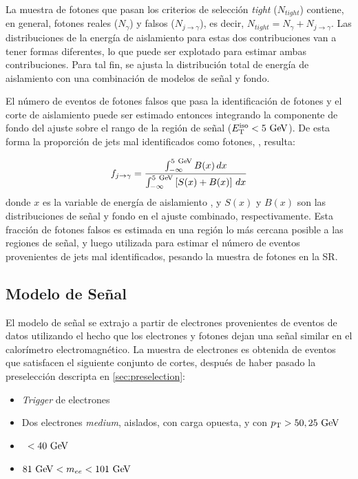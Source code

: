 La muestra de fotones que pasan los criterios de selección \emph{tight}
($N_{tight}$) contiene, en general, fotones reales ($N_{\gamma}$) y falsos
($N_{j\to\gamma}$), es decir, $N_{tight} = N_{\gamma} + N_{j\to\gamma}$.
Las distribuciones de la energía de aislamiento para estas
dos contribuciones van a tener formas diferentes, lo que puede ser explotado
para estimar ambas contribuciones. Para tal fin, se ajusta la distribución
total de energía de aislamiento con una combinación de modelos de señal y fondo.

El número de eventos de fotones falsos que pasa la identificación de fotones y
el corte de aislamiento puede ser estimado entonces integrando la componente de
fondo del ajuste sobre el rango de la región de señal ($\etiso<5\GeV$). De esta
forma la proporción de jets mal identificados como fotones, \fjg, resulta:

\begin{equation}\label{eq:jfake_formula}
  f_{j\to \gamma} = \frac{\int_{-\infty}^{5\gev} B(x)\, dx}{\int_{-\infty}^{5\gev} \left[S(x)+B(x)\right]\, dx}
\end{equation}
%
donde $x$ es la variable de energía de aislamiento \etiso, y $S(x)$ y $B(x)$ son
las distribuciones de señal y fondo en el ajuste combinado, respectivamente.
Esta fracción de fotones falsos es estimada en una región lo más cercana posible
a las regiones de señal, y luego utilizada para estimar el número de eventos
provenientes de jets mal identificados, pesando la muestra de fotones en la SR.


\subsection{Modelo de Señal} \label{sec:jfake_sig_template}

El modelo de señal se extrajo a partir de electrones provenientes de eventos de datos {\Zee}
utilizando el hecho que los
electrones y fotones dejan una señal similar en el calorímetro
electromagnético. La muestra de electrones es obtenida de eventos que satisfacen
el siguiente conjunto de cortes, después de haber pasado la preselección
descripta en \cref{sec:preselection}:

\begin{itemize}\itemsep0.1cm
\item \emph{Trigger} de electrones %
\item Dos electrones \emph{medium}, aislados, con carga opuesta, y con $\pt>50,25\gev$
\item \MET\ $<40\gev$
\item $81\gev<m_{ee}<101\gev$
\end{itemize}

